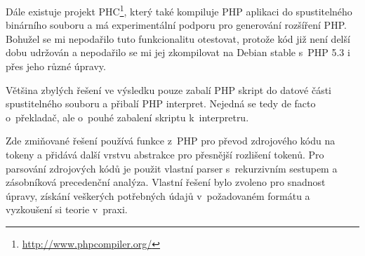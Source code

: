 \documentclass[czech]{ExcelAtFIT}
\begin{document}

		Dále existuje projekt PHC\footnote{\url{http://www.phpcompiler.org/}}, který také kompiluje PHP aplikaci do spustitelného binárního souboru a má experimentální podporu pro generování rozšíření PHP. Bohužel se mi nepodařilo tuto funkcionalitu otestovat, protože kód již není delší dobu udržován a nepodařilo se mi jej zkompilovat na Debian stable s~PHP 5.3 i přes jeho různé úpravy.


		Většina zbylých řešení ve výsledku pouze zabalí PHP skript do datové části spustitelného souboru a přibalí PHP interpret. Nejedná se tedy de facto o~pře\-kla\-dač, ale o~pouhé zabalení skriptu k~interpretru.



		Zde zmiňované řešení používá funkce z~PHP pro převod zdrojového kódu na tokeny a přidává další vrstvu abstrakce pro přesnější rozlišení tokenů. Pro parsování zdrojových kódů je použit vlastní parser s~rekurzivním sestupem a zásobníková precedenční analýza. Vlastní řešení bylo zvoleno pro snadnost úpravy, získání veškerých potřebných údajů v~po\-ža\-do\-va\-ném formátu a vyzkoušení si teorie v~praxi.
\end{document}
